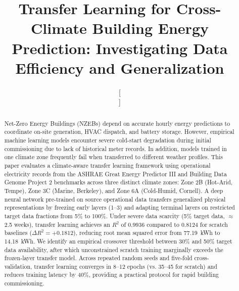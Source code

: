 \documentclass[conference]{IEEEtran}
\begin{document}
\title{Transfer Learning for Cross-Climate Building Energy Prediction: Investigating Data Efficiency and Generalization}

\author{
\and
{}
\and[\hfill\mbox{}\par\vspace{1.2ex}\mbox{}\hfill]
}

\maketitle

\begin{abstract}
Net-Zero Energy Buildings (NZEBs) depend on accurate hourly energy predictions to coordinate on-site generation, HVAC dispatch, and battery storage. However, empirical machine learning models encounter severe cold-start degradation during initial commissioning due to lack of historical meter records. In addition, models trained in one climate zone frequently fail when transferred to different weather profiles. This paper evaluates a climate-aware transfer learning framework using operational electricity records from the ASHRAE Great Energy Predictor III and Building Data Genome Project 2 benchmarks across three distinct climate zones: Zone 2B (Hot-Arid, Tempe), Zone 3C (Marine, Berkeley), and Zone 6A (Cold-Humid, Cornell). A deep neural network pre-trained on source operational data transfers generalized physical representations by freezing early layers (1--3) and adapting terminal layers on restricted target data fractions from 5\% to 100\%. Under severe data scarcity (5\% target data, $\approx$2.5 weeks), transfer learning achieves an $R^2$ of 0.9936 compared to 0.8124 for scratch baselines ($\Delta R^2 = +0.1812$), reducing root mean squared error from 77.19~kWh to 14.18~kWh. We identify an empirical crossover threshold between 30\% and 50\% target data availability, after which unconstrained scratch training marginally exceeds the frozen-layer transfer model. Across repeated random seeds and five-fold cross-validation, transfer learning converges in 8--12 epochs (vs. 35--45 for scratch) and reduces training latency by 40\%, providing a practical protocol for rapid building commissioning.
\end{abstract}
\end{document}
